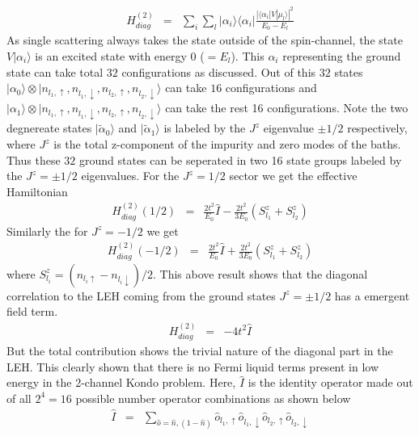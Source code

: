 \documentclass[reprint,prb,superscriptaddress]{revtex4-2}
\begin{document}
\begin{eqnarray}
H^{(2)}_{diag} &=& \sum_{i} \sum_l |\alpha_i\rangle\langle \alpha_i | \frac{|\langle \alpha_i  | V| \mu_l \rangle|^2 }{E_0-E_{l}}
\end{eqnarray}
As single scattering always takes the state outside of the spin-channel, the state $V|\alpha_i\rangle$ is an excited state with energy $0$ ($=E_l$). This $\alpha_i$ representing the ground state can take total $32$ configurations as discussed. Out of this $32$ states $| {\alpha}_0\rangle\otimes |n_{l_1,\uparrow},n_{l_1,\downarrow},n_{l_2,\uparrow},n_{l_2,\downarrow}\rangle$ can take $16$ configurations and $| {\alpha}_1\rangle\otimes |n_{l_1,\uparrow},n_{l_1,\downarrow},n_{l_2,\uparrow},n_{l_2,\downarrow}\rangle$ can take the rest 16 configurations. Note the two degnereate states $|\tilde{\alpha}_0\rangle$  and $|\tilde{\alpha}_1\rangle$ is labeled by the $J^z$ eigenvalue $\pm 1/2$ respectively, where $J^z$ is the total z-component of the impurity and zero modes of the baths. Thus these $32$ ground states can be seperated in two 16 state groups labeled by the $J^z=\pm 1/2$ eigenvalues. For the $J^z=1/2$ sector we get the effective Hamiltonian
\begin{eqnarray}
H^{(2)}_{diag} (1/2) &=& \frac{2t^2}{E_0} \hat{I} - \frac{2t^2}{3E_0} ( S_{l_1}^z + S_{l_2}^z)
\end{eqnarray}
Similarly the for $J^z=-1/2$ we get 
\begin{eqnarray}
H^{(2)}_{diag} (-1/2) &=& \frac{2t^2}{E_0} \hat{I} + \frac{2t^2}{3E_0} (S_{l_1}^z+S_{l_2}^z)
\end{eqnarray}
where $S_{l_i}^z=(n_{l_i\uparrow}-n_{l_i\downarrow})/2.$ This above result shows that the diagonal correlation to the LEH coming from the ground states $J^z=\pm 1/2$ has a emergent field term. 
\begin{eqnarray}
H^{(2)}_{diag} &=& -4t^2 \hat{I}
\end{eqnarray}
But the total contribution shows the trivial nature of the diagonal part in the LEH. This clearly shown that there is no Fermi liquid terms present in low energy in the 2-channel Kondo problem. Here, $\hat{I}$ is the identity operator made out of all $2^4=16$ possible number operator combinations as shown below
\begin{eqnarray}
\hat{I} &=& \sum_{\hat{o}=\hat{n},(1-\hat{n})} \hat{o}_{l_1,\uparrow}\hat{o}_{l_1,\downarrow} \hat{o}_{l_2,\uparrow}\hat{o}_{l_2,\downarrow}
\end{eqnarray}
\end{document}
